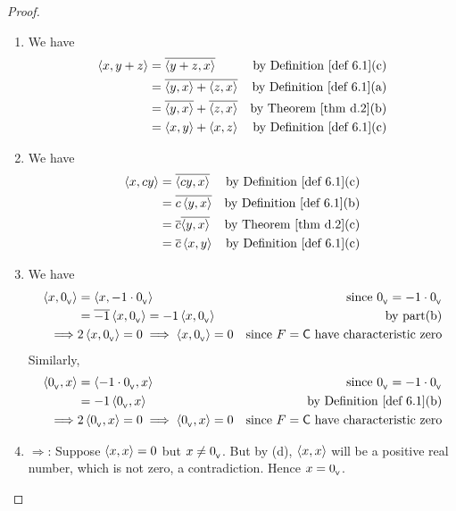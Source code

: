 \begin{proof} \ 

\begin{enumerate}
\item We have
\begin{align*}
    \LG x, y + z \RG & = \conjugatet{\LG y + z, x \RG} & \text{by \DEF{6.1}(c)} \\
        & = \conjugatet{\LG y, x \RG + \LG z, x \RG} & \text{by \DEF{6.1}(a)} \\
        & = \conjugatet{\LG y, x \RG} + \conjugatet{\LG z, x \RG} & \text{by \THM{d.2}(b)} \\
        & = \LG x, y \RG + \LG x, z \RG & \text{by \DEF{6.1}(c)}
\end{align*}

\item We have
\begin{align*}
    \LG x, cy \RG & = \conjugatet{\LG cy, x \RG} & \text{by \DEF{6.1}(c)} \\
        & = \conjugatet{c \LG y, x \RG} & \text{by \DEF{6.1}(b)} \\
        & = \conjugatet{c} \conjugatet{\LG y, x \RG} & \text{by \THM{d.2}(c)} \\
        & = \conjugatet{c} \LG x, y \RG & \text{by \DEF{6.1}(c)}
\end{align*}

\item We have
\begin{align*}
    \left< x, 0_{_{\textsf{V}}} \right> & = \left< x, -1 \cdot 0_{_{\textsf{V}}} \right> & \text{since \(0_{_{\textsf{V}}}= -1 \cdot 0_{_{\textsf{V}}}\)} \\
        & = \overline{-1} \left< x, 0_{_{\textsf{V}}} \right> = -1 \left< x, 0_{_{\textsf{V}}} \right> & \text{by part(b)} \\
    \implies & 2 \left< x, 0_{_{\textsf{V}}} \right> = 0
    \implies \left< x, 0_{_{\textsf{V}}} \right> = 0 & \text{since \(F = \textsf{C}\) have characteristic zero}
\end{align*}
Similarly,
\begin{align*}
    \LG \OV, x \RG & = \LG -1 \cdot \OV, x \RG & \text{since \(\OV = -1 \cdot \OV\)} \\
        & = -1 \LG \OV, x \RG & \text{by \DEF{6.1}(b)} \\
    \implies & 2 \LG \OV, x \RG = 0
    \implies \LG \OV, x \RG = 0 & \text{since \(F = \SET{C}\) have characteristic zero}
\end{align*}

\item
\(\Longrightarrow\): Suppose \(\left< x, x \right> = 0\) but \(x \ne 0_{_{\textsf{V}}}\).
But by (d), \(\left< x, x \right>\) will be a positive real number, which is not zero, a contradiction.
Hence \(x = 0_{_{\textsf{V}}}\).


\end{enumerate}
\end{proof}
